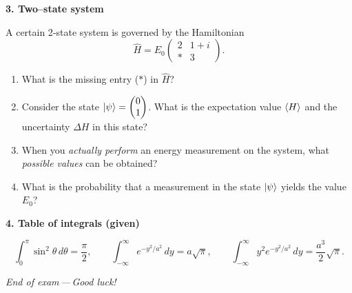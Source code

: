\documentclass[12pt]{article}
\newcommand{\qs}{\bigskip\bigskip}   %
\newcommand{\vv}{\medskip}           %
\begin{document}
\newpage
{\large\bfseries 3.\; Two–state system}\qs

A certain 2‑state system is governed by the Hamiltonian
\[
   \hat H = E_0
   \begin{pmatrix}
      2 & 1+i\\
      * & 3
   \end{pmatrix}.
\]

\vv
\begin{enumerate}[label=\textbf{\alph*)}, leftmargin=1.2cm]
  \item What is the missing entry ($*$) in $\hat H$?\vv

  \item Consider the state $\displaystyle \ket{\psi} =
        \begin{pmatrix}0 \\ 1\end{pmatrix}$.
        What is the expectation value $\expval{H}$ and the uncertainty
        $\Delta H$ in this state?\vv

  \item When you \emph{actually perform} an energy measurement on the system,
        what \emph{possible values} can be obtained?\vv

  \item What is the probability that a measurement in the state
        $\ket{\psi}$ yields the value $E_0$?
\end{enumerate}

\newpage
{\large\bfseries 4.\; Table of integrals (given)}\qs

\[
  \int_0^\pi \sin^{2}\theta \, d\theta = \frac{\pi}{2},
  \qquad
  \int_{-\infty}^{\infty} e^{-y^{2}/a^{2}}\,dy = a\sqrt{\pi},
  \qquad
  \int_{-\infty}^{\infty} y^{2} e^{-y^{2}/a^{2}}\,dy = \frac{a^{3}}{2}\sqrt{\pi}.
\]

\bigskip\bigskip
\begin{center}
    {\small\slshape End of exam\,—\,Good luck!}
\end{center}
\end{document}
